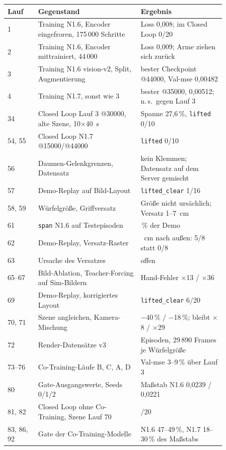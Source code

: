 {\setlength{\tabcolsep}{4pt}
\begin{longtable}{@{}l>{\raggedright\arraybackslash}p{0.47\linewidth}>{\raggedright\arraybackslash}p{0.39\linewidth}@{}}
  \toprule
  Lauf & Gegenstand & Ergebnis \\
  \midrule
  \endhead
  1 & Training N1.6, Encoder eingefroren, 175\,000 Schritte & Loss 0,008; im Closed Loop 0/20 \\
  2 & Training N1.6, Encoder mittrainiert, 44\,000 & Loss 0,009; Arme ziehen sich zurück \\
  3 & Training N1.6 vision-v2, Split, Augmentierung & bester Checkpoint @44000, Val-\ac{mse} 0,00482 \\
  4 & Training N1.7, sonst wie 3 & bester @35000, 0,00512; n.\,s.\ gegen Lauf 3 \\
  34 & Closed Loop Lauf 3 @30000, alte Szene, 10$\times$40~s & Spanne 27,6\,\%, \texttt{lifted} 0/10 \\
  54, 55 & Closed Loop N1.7 @15000/@44000 & \texttt{lifted} 0/10 \\
  56 & Daumen-Gelenkgrenzen, Datensatz & kein Klemmen; Datensatz auf dem Server gemischt \\
  57 & Demo-Replay auf Bild-Layout & \texttt{lifted\_clear} 1/16 \\
  58, 59 & Würfelgröße, Griffversatz & Größe nicht ursächlich; Versatz 1--7~cm \\
  61 & \texttt{span} N1.6 auf Testepisoden & 90\,\% der Demo \\
  62 & Demo-Replay, Versatz-Raster & 3~cm nach außen: 5/8 statt 0/8 \\
  63 & Ursache des Versatzes & offen \\
  65--67 & Bild-Ablation, Teacher-Forcing auf Sim-Bildern & Hand-Fehler $\times$13 / $\times$36 \\
  69 & Demo-Replay, korrigiertes Layout & \texttt{lifted\_clear} 6/20 \\
  70, 71 & Szene angleichen, Kamera-Mischung & $-$40\,\% / $-$18\,\%; bleibt $\times$8 / $\times$29 \\
  72 & Render-Datensätze v3 & 187 Episoden, 29\,890 Frames je Würfelgröße \\
  73--76 & Co-Training-Läufe B, C, A, D & Val-\ac{mse} 3--9\,\% über Lauf 3 \\
  80 & Gate-Ausgangswerte, Seeds 0/1/2 & Maßstab N1.6 0,0239 / 0,0221 \\
  81, 82 & Closed Loop ohne Co-Training, Szene Lauf 70 & 0/20 \\
  83, 86, 92 & Gate der Co-Training-Modelle & N1.6 47--49\,\%, N1.7 18--30\,\% des Maßstabs \\

\end{longtable}}
